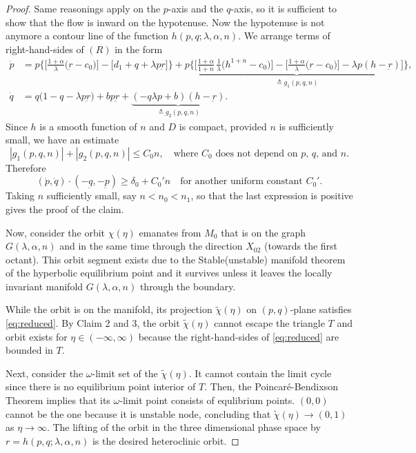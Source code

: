 \documentclass[a4paper,11pt]{article}
\def\dpp{\dot{p}}
\def\dqq{\dot{q}}
\begin{document}
\begin{proof}
Same reasonings apply on the $p$-axis and the $q$-axis, so it is sufficient to show that the flow is inward on the hypotenuse. Now the hypotenuse is not anymore a contour line of the function $h(p,q;\lambda,\alpha,n)$. We arrange terms of right-hand-sides of $(R)$ in the form
\begin{align*}
 {\dpp}&=p\bigg\{\Big[\frac{1+\alpha}{\lambda }\Big(\underbar{r}-c_0\Big)\Big] -\Big[d_1 + q + \lambda p\underbar{r}\Big]\bigg\} + \underbrace{p\bigg\{\Big[\frac{1+\alpha}{1+n}\,\frac{1}{\lambda }\Big(h^{1+n}-c_0\Big)\Big]-\Big[\frac{1+\alpha}{\lambda }\Big(\underbar{r}-c_0\Big)\Big] -\lambda p(h-\underbar{r})\Big]\bigg\}}_\text{$\triangleq g_1(p,q,n)$},\\
 {\dqq}&=q\Big(1-q-\lambda p \underbar{r}\Big) + bp\underbar{r} + \underbrace{(-q\lambda p+b) (h-\underbar{r})}_\text{$\triangleq g_2(p,q,n)$}.
\end{align*}
Since $h$ is a smooth function of $n$ and $D$ is compact, provided $n$ is sufficiently small, we have an estimate
\begin{equation}
 |g_1(p,q,n)| + |g_2(p,q,n)| \le C_0 n, \quad \text{where $C_0$ does not depend on $p$, $q$, and $n$.}
\end{equation}
Therefore
$$ (\dot{p},\dot{q}) \cdot(-\underbar{q},-\underbar{p}) \ge \delta_0 + C_0'n \quad \text{for another uniform constant $C_0'$}.$$
Taking $n$ sufficiently small, say $n<n_0<n_1$, so that the last expression is positive gives the proof of the claim. 

\medskip
Now, consider the orbit $\chi(\eta)$ emanates from $M_0$ that is on the graph $G(\lambda,\alpha,n)$ and in the same time through the direction $X_{02}$ (towards the first octant). This orbit segment exists due to the Stable(unstable) manifold theorem of the hyperbolic equilibrium point and it survives unless it leaves the locally invariant manifold $G(\lambda,\alpha,n)$ through the boundary. 

While the orbit is on the manifold, its projection $\tilde\chi(\eta)$ on $(p,q)$-plane satisfies \eqref{eq:reduced}. By Claim 2 and 3, the orbit $\tilde\chi(\eta)$ cannot escape the triangle $T$ and orbit exists for $\eta \in (-\infty,\infty)$ because the right-hand-sides of \eqref{eq:reduced} are bounded in $T$.

Next, consider the $\omega$-limit set of the $\tilde\chi(\eta)$. It cannot contain the limit cycle since there is no equilibrium point interior of $T$. Then, the Poincar\'e-Bendixson Theorem implies that its $\omega$-limit point consists of equlibrium points. $(0,0)$ cannot be the one because it is unstable node, concluding that $\tilde\chi(\eta) \rightarrow (0,1)$ as $\eta \rightarrow \infty$. The lifting of the orbit in the three dimensional phase space by $r=h(p,q;\lambda,\alpha,n)$ is the desired heteroclinic orbit.
\end{proof}
\end{document}
